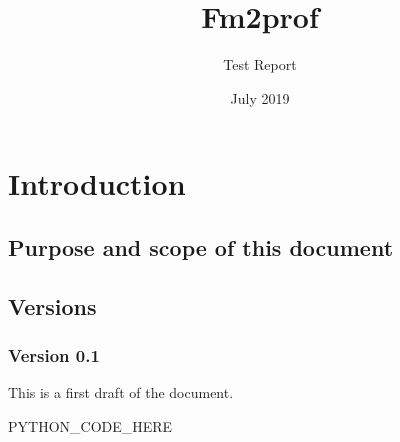 \documentclass[signature]{deltares_report}
\begin{document}
\pagestyle{empty}
\cleardoublepage
%

\newcommand{\ProgramName}{Fm2prof\xspace}

\title{\ProgramName}
\subtitle{Test Report}
\classification{-}

\date{July 2019}



\summary{}

\revieweri{}
\approvali{}

\disclaimer{}

\deltarestitle

\chapter{Introduction} 
\label{chapterIntroduction}

\section{Purpose and scope of this document} \label{sec:PurposeAndScope}

\section{Versions}
\label{sec:Versions}

\subsection{Version 0.1}
\label{sec:Version}
This is a first draft of the document.


PYTHON_CODE_HERE

\pagestyle{empty}
\mbox{}

\end{document}
